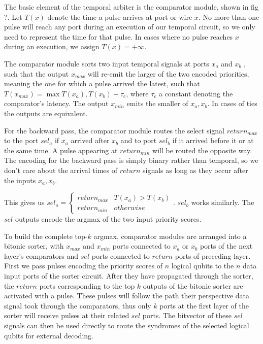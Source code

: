 \documentclass{article}
\begin{document}
The basic element of the temporal arbiter is the comparator
module, shown in fig$?$. Let $T(x)$ denote the time a pulse
arrives at port or wire $x$. No more than one pulse will
reach any port during an execution of our temporal circuit,
so we only need to represent the time for that pulse. In
cases where no pulse reaches $x$ during an execution, we
assign $T(x) = +\infty$.

The comparator module sorts two input temporal signals at
ports $x_a$ and $x_b$ , such that the output $x_{max}$ will
re-emit the larger of the two encoded priorities, meaning
the one for which a pulse arrived the latest, such that
$T(x_{max}) = \max{T(x_a), T(x_b)} + \tau_c$, where $\tau_c$
a constant denoting the comparator's latency. The output
$x_{min}$ emits the smaller of $x_a, x_b$. In cases of ties
the outputs are equivalent.

For the backward pass, the comparator module routes the
select signal $return_{max}$ to the port $sel_{a}$ if $x_a$
arrived after $x_b$ and to port $sel_{b}$ if it arrived
before it or at the same time. A pulse appearing at
$return_{min}$ will be routed the opposite way. The encoding
for the backward pass is simply binary rather than temporal,
so we don't care about the arrival times of $return$ signals
as long as they occur after the inputs $x_a, x_b$. 

This gives us $sel_a = \begin{cases} return_{max} &
T(x_a)>T(x_b) \\ return_{min} & otherwise \end{cases}$.
$sel_b$ works similarly. The $sel$ outputs encode the argmax
of the two input priority scores. 

To build the complete top-$k$ argmax, comparator modules are
arranged into a bitonic sorter, with $x_{max}$ and $x_{min}$
ports connected to $x_a$ or $x_b$ ports of the next layer's
comparators and $sel$ ports connected to $return$ ports of
preceding layer. First we pass pulses encoding the priority
scores of $n$ logical qubits to the $n$ data input ports of
the sorter circuit. After they have propagated through the
sorter, the $return$ ports corresponding to the top $k$
outputs of the bitonic sorter are activated with a pulse.
These pulses will follow the path their perspective data
signal took through the comparators, thus only $k$ ports at
the first layer of the sorter will receive pulses at their
related $sel$ ports. The bitvector of these $sel$ signals
can then be used directly to route the syndromes of the
selected logical qubits for external decoding.
\end{document}
